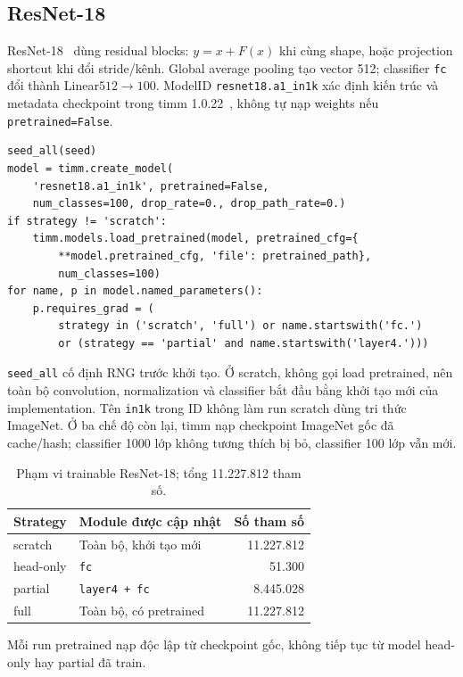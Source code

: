 \documentclass[11pt,a4paper]{article}
\begin{document}
\subsection{ResNet-18}
ResNet-18~\cite{resnet} dùng residual blocks: $y=x+F(x)$ khi cùng shape, hoặc projection shortcut khi đổi stride/kênh. Global average pooling tạo vector 512; classifier \texttt{fc} đổi thành Linear$512\to 100$. ModelID \texttt{resnet18.a1\_in1k} xác định kiến trúc và metadata checkpoint trong timm 1.0.22~\cite{timm}, không tự nạp weights nếu \texttt{pretrained=False}.
\begin{lstlisting}
seed_all(seed)
model = timm.create_model(
    'resnet18.a1_in1k', pretrained=False,
    num_classes=100, drop_rate=0., drop_path_rate=0.)
if strategy != 'scratch':
    timm.models.load_pretrained(model, pretrained_cfg={
        **model.pretrained_cfg, 'file': pretrained_path},
        num_classes=100)
for name, p in model.named_parameters():
    p.requires_grad = (
        strategy in ('scratch', 'full') or name.startswith('fc.')
        or (strategy == 'partial' and name.startswith('layer4.')))
\end{lstlisting}
\texttt{seed\_all} cố định RNG trước khởi tạo. Ở scratch, không gọi load pretrained, nên toàn bộ convolution, normalization và classifier bắt đầu bằng khởi tạo mới của implementation. Tên \texttt{in1k} trong ID không làm run scratch dùng tri thức ImageNet. Ở ba chế độ còn lại, timm nạp checkpoint ImageNet gốc đã cache/hash; classifier 1000 lớp không tương thích bị bỏ, classifier 100 lớp vẫn mới.

\begin{table}[htbp]\centering\small\caption{Phạm vi trainable ResNet-18; tổng 11.227.812 tham số.}
\begin{tabular}{llr}\toprule Strategy & Module được cập nhật & Số tham số\\\midrule
scratch & Toàn bộ, khởi tạo mới &11.227.812\\
head-only & \texttt{fc} &51.300\\
partial & \texttt{layer4 + fc} &8.445.028\\
full & Toàn bộ, có pretrained &11.227.812\\\bottomrule\end{tabular}\end{table}
Mỗi run pretrained nạp độc lập từ checkpoint gốc, không tiếp tục từ model head-only hay partial đã train.
\clearpage
\end{document}
